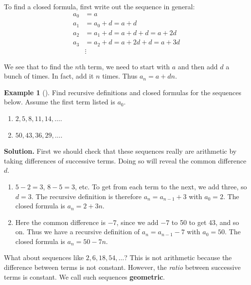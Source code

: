 \documentclass[10pt,]{book}
\newcommand{\terminology}[1]{\textbf{#1}}
\theoremstyle{plain}
\theoremstyle{definition}
\theoremstyle{definition}
\newtheorem{example}[theorem]{Example}
\theoremstyle{definition}
\theoremstyle{definition}
\numberwithin{equation}{chapter}
\newcommand{\amp}{&}
\begin{document}
%
\par
\hypertarget{p-110}{}%
To find a closed formula, first write out the sequence in general:%
\begin{align*}
a_0 \amp = a\\
a_1 \amp = a_0 + d = a+d\\
a_2 \amp = a_1 + d = a+d+d = a+2d\\
a_3 \amp = a_2 + d = a+2d+d = a+3d\\
\amp \vdots 
\end{align*}
%
\par
\hypertarget{p-111}{}%
We see that to find the \(n\)th term, we need to start with \(a\) and then add \(d\) a bunch of times. In fact, add it \(n\) times. Thus \(a_n = a+dn\).%
\begin{example}[]\label{example-5}
\hypertarget{p-112}{}%
Find recursive definitions and closed formulas for the sequences below. Assume the first term listed is \(a_0\).%
\par
\hypertarget{p-113}{}%
\leavevmode%
\begin{enumerate}
\item\hypertarget{li-78}{}\(2, 5, 8, 11, 14, \ldots\).%
\item\hypertarget{li-79}{}\(50, 43, 36, 29, \ldots\).%
\end{enumerate}
%
\par\smallskip%
\noindent\textbf{Solution.}\hypertarget{solution-7}{}\quad%
\hypertarget{p-114}{}%
First we should check that these sequences really are arithmetic by taking differences of successive terms. Doing so will reveal the common difference \(d\).%
\par
\hypertarget{p-115}{}%
\leavevmode%
\begin{enumerate}
\item\hypertarget{li-80}{}\(5-2 = 3\), \(8-5 = 3\), etc. To get from each term to the next, we add three, so \(d = 3\). The recursive definition is therefore \(a_n = a_{n-1} + 3\) with \(a_0 = 2\). The closed formula is \(a_n = 2 + 3n\).%
\item\hypertarget{li-81}{}\hypertarget{p-116}{}%
Here the common difference is \(-7\), since we add \(-7\) to 50 to get 43, and so on. Thus we have a recursive definition of \(a_n = a_{n-1} - 7\) with \(a_0 = 50\). The closed formula is \(a_n = 50 - 7n\).%
\end{enumerate}
%
\end{example}
\hypertarget{p-117}{}%
What about sequences like \(2, 6, 18, 54, \ldots\)? This is not arithmetic because the difference between terms is not constant. However, the \emph{ratio} between successive terms is constant. We call such sequences \terminology{geometric}.%
\end{document}
